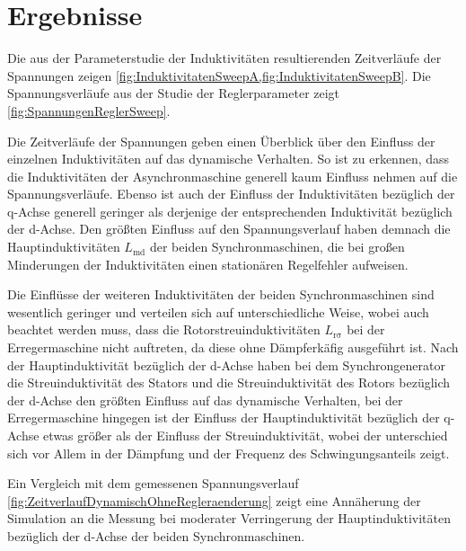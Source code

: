 \section{Ergebnisse}
Die aus der Parameterstudie der Induktivitäten resultierenden Zeitverläufe der Spannungen zeigen \cref{fig:InduktivitatenSweepA,fig:InduktivitatenSweepB}. Die Spannungsverläufe aus der Studie der Reglerparameter zeigt \cref{fig:SpannungenReglerSweep}.

Die Zeitverläufe der Spannungen geben einen Überblick über den Einfluss der einzelnen Induktivitäten auf das dynamische Verhalten. So ist zu erkennen, dass die Induktivitäten der Asynchronmaschine generell kaum Einfluss nehmen auf die Spannungsverläufe. Ebenso ist auch der Einfluss der Induktivitäten bezüglich der q-Achse generell geringer als derjenige der entsprechenden Induktivität bezüglich der d-Achse. Den größten Einfluss auf den Spannungsverlauf haben demnach die Hauptinduktivitäten $L_{\mathrm{md}}$ der beiden Synchronmaschinen, die bei großen Minderungen der Induktivitäten einen stationären Regelfehler aufweisen.

Die Einflüsse der weiteren Induktivitäten der beiden Synchronmaschinen sind wesentlich geringer und verteilen sich auf unterschiedliche Weise, wobei auch beachtet werden muss, dass die Rotorstreuinduktivitäten $L_{\mathrm{r\sigma}}$ bei der Erregermaschine nicht auftreten, da diese ohne Dämpferkäfig ausgeführt ist. Nach der Hauptinduktivität bezüglich der d-Achse haben bei dem Synchrongenerator die Streuinduktivität des Stators und die Streuinduktivität des Rotors bezüglich der d-Achse den größten Einfluss auf das dynamische Verhalten, bei der Erregermaschine hingegen ist der Einfluss der Hauptinduktivität bezüglich der q-Achse etwas größer als der Einfluss der Streuinduktivität, wobei der unterschied sich vor Allem in der Dämpfung und der Frequenz des Schwingungsanteils zeigt. 

Ein Vergleich mit dem gemessenen Spannungsverlauf \cref{fig:ZeitverlaufDynamischOhneRegleraenderung} zeigt eine Annäherung der Simulation an die Messung bei moderater Verringerung der Hauptinduktivitäten bezüglich der d-Achse der beiden Synchronmaschinen.

